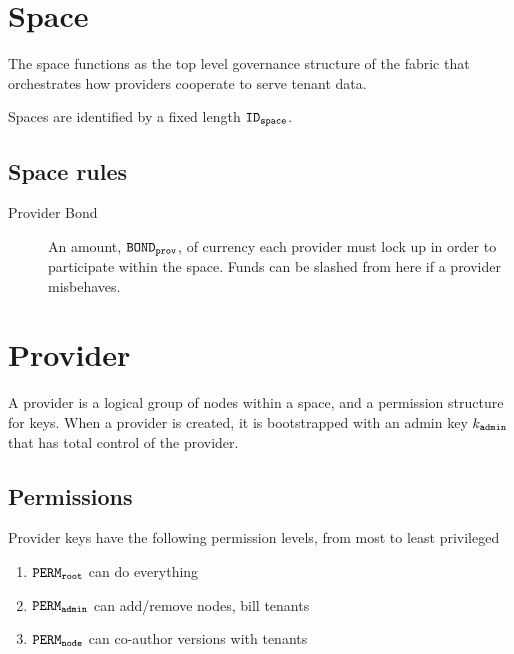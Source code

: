\documentclass{article}
\begin{document}
\pagebreak
\section{Space}

The space functions as the top level governance structure of the fabric that orchestrates how providers cooperate to serve tenant data. 

Spaces are identified by a fixed length $\mathtt{ID_{space}}$.

\subsection{Space rules}
\begin{description}
  \item[Provider Bond] An amount, $\mathtt{BOND_{prov}}$, of currency each provider must lock up in order to participate within the space. Funds can be slashed from here if a provider misbehaves.
\end{description}

\section{Provider}

A provider is a logical group of nodes within a space, and a permission structure for keys.
When a provider is created, it is bootstrapped with an admin key $k_\mathtt{admin}$ that has total control of the provider.

\subsection{Permissions}
Provider keys have the following permission levels, from most to least privileged

\begin{enumerate}
  \item $\mathtt{PERM_{root}}$ can do everything
  \item $\mathtt{PERM_{admin}}$ can add/remove nodes, bill tenants
  \item $\mathtt{PERM_{node}}$ can co-author versions with tenants
\end{enumerate}
\end{document}
